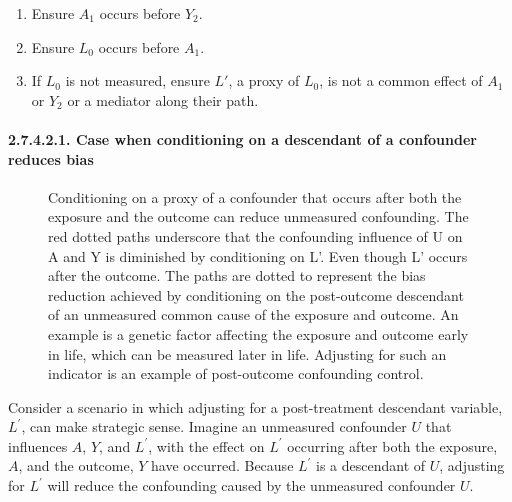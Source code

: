 \documentclass[
  singlecolumn]{article}
\let\oldparagraph\paragraph
\renewcommand{\paragraph}[1]{\oldparagraph{#1}\mbox{}}
\providecommand{\tightlist}{%
  \setlength{\itemsep}{0pt}\setlength{\parskip}{0pt}}\usepackage{longtable,booktabs,array}
\begin{document}
\begin{enumerate}
\def\labelenumi{\arabic{enumi}.}
\tightlist
\item
  Ensure \(A_1\) occurs before \(Y_2\).
\item
  Ensure \(L_0\) occurs before \(A_1\).
\item
  If \(L_0\) is not measured, ensure \(L'\), a proxy of \(L_0\), is not
  a common effect of \(A_1\) or \(Y_2\) or a mediator along their path.
\end{enumerate}

\paragraph{2.7.4.2.1. Case when conditioning on a descendant of a
confounder reduces
bias}\label{case-when-conditioning-on-a-descendant-of-a-confounder-reduces-bias}

\begin{figure}


\caption{\label{fig-dag-descendant-solution-2}Conditioning on a proxy of
a confounder that occurs after both the exposure and the outcome can
reduce unmeasured confounding. The red dotted paths underscore that the
confounding influence of U on A and Y is diminished by conditioning on
L'. Even though L' occurs after the outcome. The paths are dotted to
represent the bias reduction achieved by conditioning on the
post-outcome descendant of an unmeasured common cause of the exposure
and outcome. An example is a genetic factor affecting the exposure and
outcome early in life, which can be measured later in life. Adjusting
for such an indicator is an example of post-outcome confounding
control.}

\end{figure}%

Consider a scenario in which adjusting for a post-treatment descendant
variable, \(L^\prime\), can make strategic sense. Imagine an unmeasured
confounder \(U\) that influences \(A\), \(Y\), and \(L^\prime\), with
the effect on \(L^\prime\) occurring after both the exposure, \(A\), and
the outcome, \(Y\) have occurred. Because \(L^\prime\) is a descendant
of \(U\), adjusting for \(L^\prime\) will reduce the confounding caused
by the unmeasured confounder \(U\).
\end{document}
